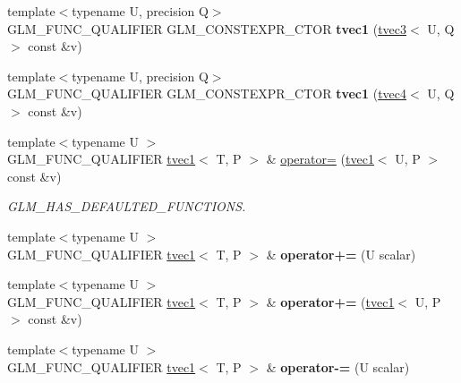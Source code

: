 \begin{DoxyCompactItemize}
{\footnotesize template$<$typename U, precision Q$>$ }\\G\+L\+M\+\_\+\+F\+U\+N\+C\+\_\+\+Q\+U\+A\+L\+I\+F\+I\+ER G\+L\+M\+\_\+\+C\+O\+N\+S\+T\+E\+X\+P\+R\+\_\+\+C\+T\+OR {\bfseries tvec1} (\hyperlink{structglm_1_1tvec3}{tvec3}$<$ U, Q $>$ const \&v)
\item 
\mbox{\label{structglm_1_1tvec1_a37a72fd06b4e08a6f6d5e7d85219435b}} 
{\footnotesize template$<$typename U, precision Q$>$ }\\G\+L\+M\+\_\+\+F\+U\+N\+C\+\_\+\+Q\+U\+A\+L\+I\+F\+I\+ER G\+L\+M\+\_\+\+C\+O\+N\+S\+T\+E\+X\+P\+R\+\_\+\+C\+T\+OR {\bfseries tvec1} (\hyperlink{structglm_1_1tvec4}{tvec4}$<$ U, Q $>$ const \&v)
\item 
\mbox{\label{structglm_1_1tvec1_afd831051f2b79ce40423c5c3c3113829}} 
{\footnotesize template$<$typename U $>$ }\\G\+L\+M\+\_\+\+F\+U\+N\+C\+\_\+\+Q\+U\+A\+L\+I\+F\+I\+ER \hyperlink{structglm_1_1tvec1}{tvec1}$<$ T, P $>$ \& \hyperlink{structglm_1_1tvec1_afd831051f2b79ce40423c5c3c3113829}{operator=} (\hyperlink{structglm_1_1tvec1}{tvec1}$<$ U, P $>$ const \&v)
\begin{DoxyCompactList}\small\item\em G\+L\+M\+\_\+\+H\+A\+S\+\_\+\+D\+E\+F\+A\+U\+L\+T\+E\+D\+\_\+\+F\+U\+N\+C\+T\+I\+O\+NS. \end{DoxyCompactList}\item 
\mbox{\label{structglm_1_1tvec1_a793ef2e8275fca7c1d9daf47557fa145}} 
{\footnotesize template$<$typename U $>$ }\\G\+L\+M\+\_\+\+F\+U\+N\+C\+\_\+\+Q\+U\+A\+L\+I\+F\+I\+ER \hyperlink{structglm_1_1tvec1}{tvec1}$<$ T, P $>$ \& {\bfseries operator+=} (U scalar)
\item 
\mbox{\label{structglm_1_1tvec1_ac579b8e14a7aa466cb0185e0e5fb7b3d}} 
{\footnotesize template$<$typename U $>$ }\\G\+L\+M\+\_\+\+F\+U\+N\+C\+\_\+\+Q\+U\+A\+L\+I\+F\+I\+ER \hyperlink{structglm_1_1tvec1}{tvec1}$<$ T, P $>$ \& {\bfseries operator+=} (\hyperlink{structglm_1_1tvec1}{tvec1}$<$ U, P $>$ const \&v)
\item 
\mbox{\label{structglm_1_1tvec1_af8bf716ff4244ed3e83768afe01f04eb}} 
{\footnotesize template$<$typename U $>$ }\\G\+L\+M\+\_\+\+F\+U\+N\+C\+\_\+\+Q\+U\+A\+L\+I\+F\+I\+ER \hyperlink{structglm_1_1tvec1}{tvec1}$<$ T, P $>$ \& {\bfseries operator-\/=} (U scalar)

\end{DoxyCompactItemize}
